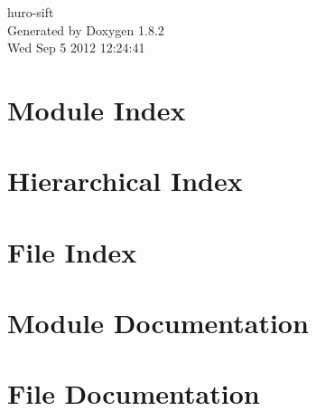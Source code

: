 \documentclass{book}
\begin{document}
\hypersetup{pageanchor=false,citecolor=blue}
\begin{titlepage}
\vspace*{7cm}
\begin{center}
{\Large huro-\/sift }\\
\vspace*{1cm}
{\large Generated by Doxygen 1.8.2}\\
\vspace*{0.5cm}
{\small Wed Sep 5 2012 12:24:41}\\
\end{center}
\end{titlepage}
\clearemptydoublepage
{}
\tableofcontents
\clearemptydoublepage
{}
\hypersetup{pageanchor=true,citecolor=blue}
\chapter{Module Index}

\chapter{Hierarchical Index}

\chapter{File Index}

\chapter{Module Documentation}



\chapter{File Documentation}



































\printindex
\end{document}

